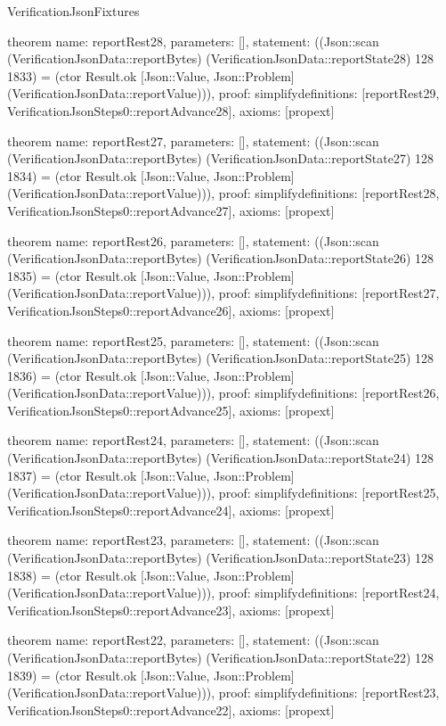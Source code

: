 \begin{lexlean}{VerificationJsonFixtures}
\begin{semanticmodule}
theorem{
  name: reportRest28,
  parameters: [],
  statement: ((Json::scan (VerificationJsonData::reportBytes) (VerificationJsonData::reportState28) 128 1833) = (ctor Result.ok [Json::Value, Json::Problem] (VerificationJsonData::reportValue))),
  proof: simplify{definitions: [reportRest29, VerificationJsonSteps0::reportAdvance28]},
  axioms: [propext]
}

theorem{
  name: reportRest27,
  parameters: [],
  statement: ((Json::scan (VerificationJsonData::reportBytes) (VerificationJsonData::reportState27) 128 1834) = (ctor Result.ok [Json::Value, Json::Problem] (VerificationJsonData::reportValue))),
  proof: simplify{definitions: [reportRest28, VerificationJsonSteps0::reportAdvance27]},
  axioms: [propext]
}

theorem{
  name: reportRest26,
  parameters: [],
  statement: ((Json::scan (VerificationJsonData::reportBytes) (VerificationJsonData::reportState26) 128 1835) = (ctor Result.ok [Json::Value, Json::Problem] (VerificationJsonData::reportValue))),
  proof: simplify{definitions: [reportRest27, VerificationJsonSteps0::reportAdvance26]},
  axioms: [propext]
}

theorem{
  name: reportRest25,
  parameters: [],
  statement: ((Json::scan (VerificationJsonData::reportBytes) (VerificationJsonData::reportState25) 128 1836) = (ctor Result.ok [Json::Value, Json::Problem] (VerificationJsonData::reportValue))),
  proof: simplify{definitions: [reportRest26, VerificationJsonSteps0::reportAdvance25]},
  axioms: [propext]
}

theorem{
  name: reportRest24,
  parameters: [],
  statement: ((Json::scan (VerificationJsonData::reportBytes) (VerificationJsonData::reportState24) 128 1837) = (ctor Result.ok [Json::Value, Json::Problem] (VerificationJsonData::reportValue))),
  proof: simplify{definitions: [reportRest25, VerificationJsonSteps0::reportAdvance24]},
  axioms: [propext]
}

theorem{
  name: reportRest23,
  parameters: [],
  statement: ((Json::scan (VerificationJsonData::reportBytes) (VerificationJsonData::reportState23) 128 1838) = (ctor Result.ok [Json::Value, Json::Problem] (VerificationJsonData::reportValue))),
  proof: simplify{definitions: [reportRest24, VerificationJsonSteps0::reportAdvance23]},
  axioms: [propext]
}

theorem{
  name: reportRest22,
  parameters: [],
  statement: ((Json::scan (VerificationJsonData::reportBytes) (VerificationJsonData::reportState22) 128 1839) = (ctor Result.ok [Json::Value, Json::Problem] (VerificationJsonData::reportValue))),
  proof: simplify{definitions: [reportRest23, VerificationJsonSteps0::reportAdvance22]},
  axioms: [propext]
}


\end{semanticmodule}
\end{lexlean}
